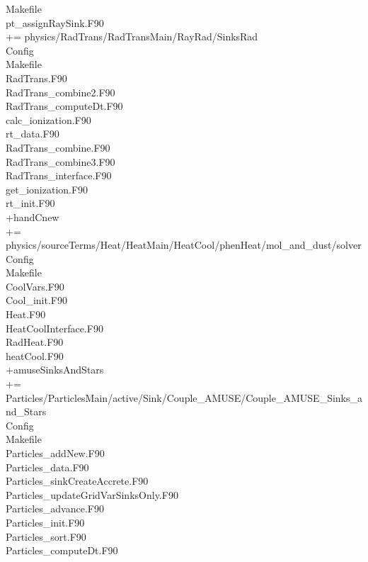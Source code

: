 \documentclass[10pt]{article}
\newcommand*{\tab}{\hspace*{10mm}}
\begin{document}
{\tab\tab Makefile\\
\tab\tab pt\_assignRaySink.F90\\
\tab += physics/RadTrans/RadTransMain/RayRad/SinksRad\\
\tab\tab Config\\
\tab\tab Makefile\\
\tab\tab RadTrans.F90\\
\tab\tab RadTrans\_combine2.F90\\
\tab\tab RadTrans\_computeDt.F90\\
\tab\tab calc\_ionization.F90\\
\tab\tab rt\_data.F90\\
\tab\tab RadTrans\_combine.F90\\
\tab\tab RadTrans\_combine3.F90\\
\tab\tab RadTrans\_interface.F90\\
\tab\tab get\_ionization.F90\\
\tab\tab rt\_init.F90\\
+handCnew\\
\tab += physics/sourceTerms/Heat/HeatMain/HeatCool/phenHeat/mol\_and\_dust/solver\\
\tab\tab Config\\
\tab\tab Makefile\\
\tab\tab CoolVars.F90\\
\tab\tab Cool\_init.F90\\
\tab\tab Heat.F90\\
\tab\tab HeatCoolInterface.F90\\
\tab\tab RadHeat.F90\\
\tab\tab heatCool.F90\\
+amuseSinksAndStars\\
\tab += Particles/ParticlesMain/active/Sink/Couple\_AMUSE/Couple\_AMUSE\_Sinks\_and\_Stars\\
\tab\tab Config\\
\tab\tab Makefile\\
\tab\tab Particles\_addNew.F90\\
\tab\tab Particles\_data.F90\\
\tab\tab Particles\_sinkCreateAccrete.F90\\
\tab\tab Particles\_updateGridVarSinksOnly.F90\\
\tab\tab Particles\_advance.F90\\
\tab\tab Particles\_init.F90\\
\tab\tab Particles\_sort.F90\\
\tab\tab Particles\_computeDt.F90\\
}
\end{document}
